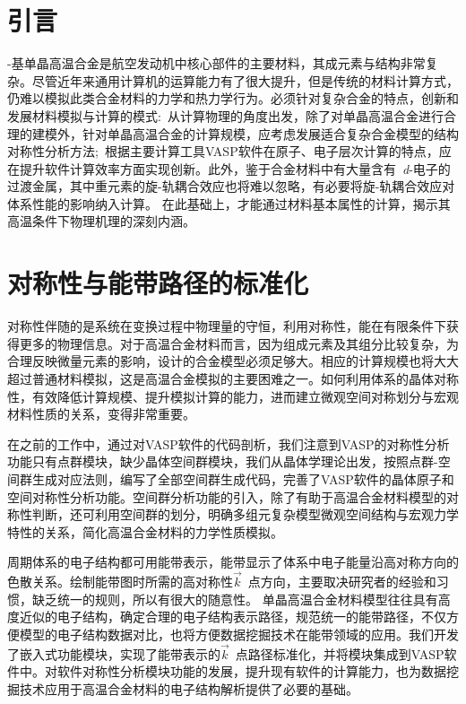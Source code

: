 \section{引言}
-基单晶高温合金是航空发动机中核心部件的主要材料，其成元素与结构非常复杂。尽管近年来通用计算机的运算能力有了很大提升，但是传统的材料计算方式，仍难以模拟此类合金材料的力学和热力学行为。必须针对复杂合金的特点，创新和发展材料模拟与计算的模式:~从计算物理的角度出发，除了对单晶高温合金进行合理的建模外，针对单晶高温合金的计算规模，应考虑发展适合复杂合金模型的结构对称性分析方法;~根据主要计算工具\textrm{VASP}软件在原子、电子层次计算的特点，应在提升软件计算效率方面实现创新。此外，鉴于合金材料中有大量含有~\textit{d}-电子的过渡金属，其中重元素的旋-轨耦合效应也将难以忽略，有必要将旋-轨耦合效应对体系性能的影响纳入计算。 在此基础上，才能通过材料基本属性的计算，揭示其高温条件下物理机理的深刻内涵。

\section{对称性与能带路径的标准化}
对称性伴随的是系统在变换过程中物理量的守恒，利用对称性，能在有限条件下获得更多的物理信息。对于高温合金材料而言，因为组成元素及其组分比较复杂，为合理反映微量元素的影响，设计的合金模型必须足够大。相应的计算规模也将大大超过普通材料模拟，这是高温合金模拟的主要困难之一。如何利用体系的晶体对称性，有效降低计算规模、提升模拟计算的能力，进而建立微观空间对称划分与宏观材料性质的关系，变得非常重要。

在之前的工作中，通过对\textrm{VASP}软件的代码剖析，我们注意到\textrm{VASP}的对称性分析功能只有点群模块，缺少晶体空间群模块，我们从晶体学理论出发，按照点群-空间群生成对应法则，编写了全部空间群生成代码，完善了\textrm{VASP}软件的晶体原子和空间对称性分析功能。空间群分析功能的引入，除了有助于高温合金材料模型的对称性判断，还可利用空间群的划分，明确多组元复杂模型微观空间结构与宏观力学特性的关系，简化高温合金材料的力学性质模拟。

周期体系的电子结构都可用能带表示，能带显示了体系中电子能量沿高对称方向的色散关系。绘制能带图时所需的高对称性$\vec k$~点方向，主要取决研究者的经验和习惯，缺乏统一的规则，所以有很大的随意性。%
单晶高温合金材料模型往往具有高度近似的电子结构，确定合理的电子结构表示路径，规范统一的能带路径，不仅方便模型的电子结构数据对比，也将方便数据挖掘技术在能带领域的应用。我们开发了嵌入式功能模块，实现了能带表示的$\vec k$~点路径标准化，并将模块集成到\textrm{VASP}软件中。对软件对称性分析模块功能的发展，提升现有软件的计算能力，也为数据挖掘技术应用于高温合金材料的电子结构解析提供了必要的基础。

